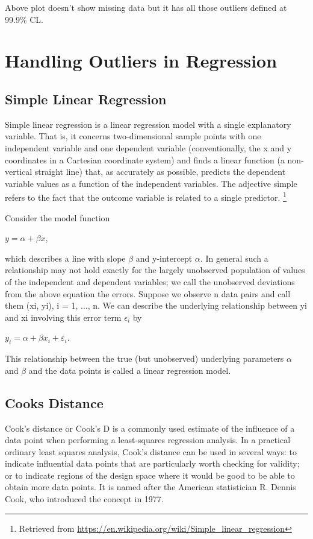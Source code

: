 \documentclass{article}
\begin{document}
Above plot doesn't show missing data but it has all those outliers defined at 99.9\% CL. 

\section{Handling Outliers in Regression}

\subsection{Simple Linear Regression}

Simple linear regression is a linear regression model with a single explanatory variable. That is, it concerns two-dimensional sample points with one independent variable and one dependent variable (conventionally, the x and y coordinates in a Cartesian coordinate system) and finds a linear function (a non-vertical straight line) that, as accurately as possible, predicts the dependent variable values as a function of the independent variables. The adjective simple refers to the fact that the outcome variable is related to a single predictor. \footnote{Retrieved from \url{https://en.wikipedia.org/wiki/Simple_linear_regression}}

Consider the model function

${y=\alpha +\beta x,}$

which describes a line with slope $\beta$ and y-intercept $\alpha$. In general such a relationship may not hold exactly for the largely unobserved population of values of the independent and dependent variables; we call the unobserved deviations from the above equation the errors. Suppose we observe n data pairs and call them {(xi, yi), i = 1, ..., n}. We can describe the underlying relationship between yi and xi involving this error term $\epsilon_{i}$ by

$y_i = \alpha + \beta x_i + \varepsilon_i.$

This relationship between the true (but unobserved) underlying parameters $\alpha$ and $\beta$ and the data points is called a linear regression model.

\subsection{Cooks Distance}

Cook's distance or Cook's D is a commonly used estimate of the influence of a data point when performing a least-squares regression analysis. In a practical ordinary least squares analysis, Cook's distance can be used in several ways: to indicate influential data points that are particularly worth checking for validity; or to indicate regions of the design space where it would be good to be able to obtain more data points. It is named after the American statistician R. Dennis Cook, who introduced the concept in 1977.
\end{document}
